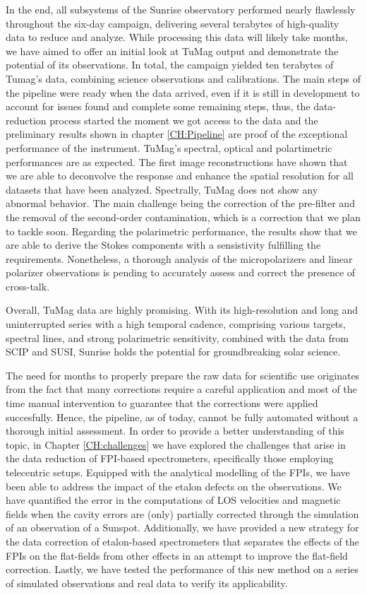 In the end, all subsystems of the Sunrise observatory performed nearly flawlessly throughout the six-day campaign, delivering several terabytes of high-quality data to reduce and analyze. While processing this data will likely take months, we have aimed to offer an initial look at TuMag output and demonstrate the potential of its observations. In total, the campaign yielded ten terabytes of Tumag's data, combining science observations and calibrations. The main steps of the pipeline were ready when the data arrived, even if it is still in development to account for issues found and complete some remaining steps, thus, the data-reduction process started the moment we got access to the data and the preliminary results shown in chapter \ref{CH:Pipeline} are proof of the exceptional performance of the instrument. TuMag's spectral, optical and polartimetric performances are as expected. The first image reconstructions have shown that we are able to deconvolve the response and enhance the spatial resolution for all datasets that have been analyzed. Spectrally, TuMag does not show any abnormal behavior. The main challenge being the correction of the pre-filter and the removal of the second-order contamination, which is a correction that we plan to tackle soon. Regarding the polarimetric performance, the results show that we are able to derive the Stokes components with a sensistivity fulfilling the requirements. Nonetheless, a thorough analysis of the micropolarizers and linear polarizer observations is pending to accurately assess and correct the presence of cross-talk.

Overall, TuMag data are highly promising. With its high-resolution and long and uninterrupted series with a high temporal cadence, comprising various targets, spectral lines, and strong polarimetric sensitivity, combined with the data from SCIP and SUSI, Sunrise holds the potential for groundbreaking solar science. 

The need for months to properly prepare the raw data for scientific use originates from the fact that many corrections require a careful application and most of the time manual intervention to guarantee that the corrections were applied succesfully. Hence, the pipeline, as of today, cannot be fully automated without a thorough initial assessment. In order to provide a better understanding of this topic, in Chapter \ref{CH:challenges} we have explored the challenges that arise in the data reduction of FPI-based spectrometers, specifically those employing telecentric setups. Equipped with the analytical modelling of the FPIs, we have been able to address the impact of the etalon defects on the observations. We have quantified the error in the computations of LOS velocities and magnetic fields when the cavity errors are (only) partially corrected through the simulation of an observation of a Sunspot. Additionally, we have provided a new strategy for the data correction of etalon-based spectrometers that separates the effects of the FPIs on the flat-fields from other effects in an attempt to improve the flat-field correction. Lastly, we have tested the performance of this new method on a series of simulated observations and real data to verify its applicability. 

